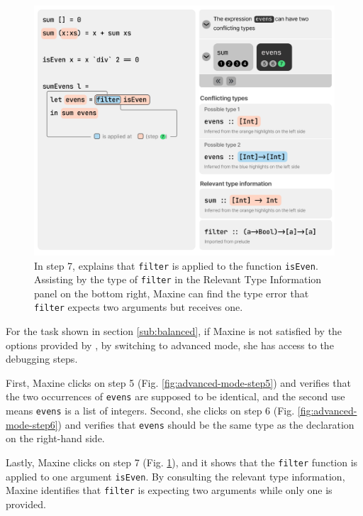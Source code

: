 \begin{figure}
        \centering
        \includegraphics[width=\linewidth,trim=0mm 8mm 0mm 0mm]{images/advanced-mode-3.pdf}
        \caption{
            In step 7, \chameleon{} 
            explains that \texttt{filter} is applied to 
            the function \texttt{isEven}. Assisting by 
            the type of \texttt{filter} in the 
            Relevant Type Information panel on the bottom
            right, Maxine can find the type error that 
            \texttt{filter} expects two arguments but receives one.
        }
        \label{fig:advanced-mode-step7}
\end{figure}

For the task shown in section \ref{sub:balanced}, if Maxine is not satisfied by
the options provided by \chameleon{}, by switching to advanced
mode, she has access to the debugging steps. 

First, Maxine clicks on step 5 (Fig. \ref{fig:advanced-mode-step5}) and verifies
that the two occurrences of \texttt{evens} are supposed to be identical, and the
second use means \texttt{evens} is a list of integers. Second, she
clicks on step 6 (Fig. \ref{fig:advanced-mode-step6}) and verifies that
\texttt{evens} should be the same type as the declaration on the right-hand
side. 


Lastly, Maxine clicks on step 7 (Fig. \ref{fig:advanced-mode-step7}), and
it shows that the \texttt{filter} function is applied to one argument
\texttt{isEven}. By consulting the relevant type information, Maxine identifies
that \texttt{filter} is expecting two arguments while only one is provided. 


